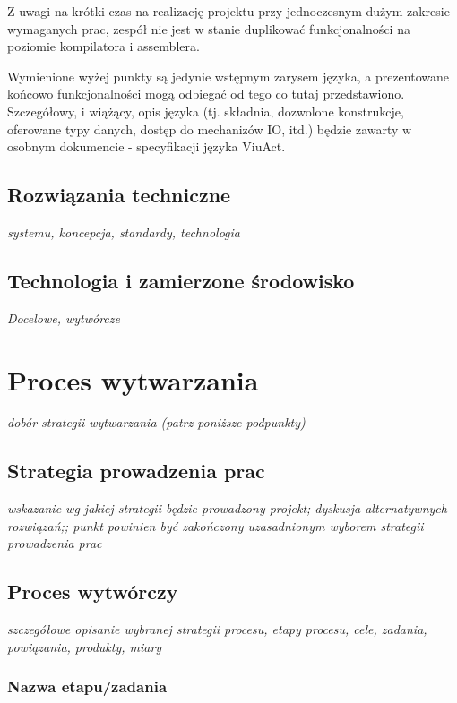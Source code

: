 \documentclass[11pt,oneside,a4paper,titlepage,onecolumn]{article}
\begin{document}
Z uwagi na krótki czas na realizację projektu przy jednoczesnym dużym zakresie wymaganych prac, zespół nie
jest w stanie duplikować funkcjonalności na poziomie kompilatora i assemblera.

Wymienione wyżej punkty są jedynie wstępnym zarysem języka, a prezentowane końcowo funkcjonalności mogą
odbiegać od tego co tutaj przedstawiono. Szczegółowy, i wiążący, opis języka (tj. składnia, dozwolone
konstrukcje, oferowane typy danych, dostęp do mechanizów IO, itd.) będzie zawarty w osobnym dokumencie -
specyfikacji języka ViuAct.

\subsection{Rozwiązania techniczne}

\emph{systemu, koncepcja, standardy, technologia}

\subsection{Technologia i zamierzone środowisko}

\emph{Docelowe, wytwórcze}

\section{Proces wytwarzania}

\emph{dobór strategii wytwarzania (patrz poniższe podpunkty)}

\subsection{Strategia prowadzenia prac}

\emph{wskazanie wg jakiej strategii będzie prowadzony projekt; dyskusja alternatywnych rozwiązań;; punkt powinien być zakończony uzasadnionym wyborem strategii prowadzenia prac}

\subsection{Proces wytwórczy}

\emph{szczegółowe opisanie wybranej strategii procesu, etapy procesu, cele, zadania, powiązania, produkty, miary}

\subsubsection{Nazwa etapu/zadania}
\end{document}
